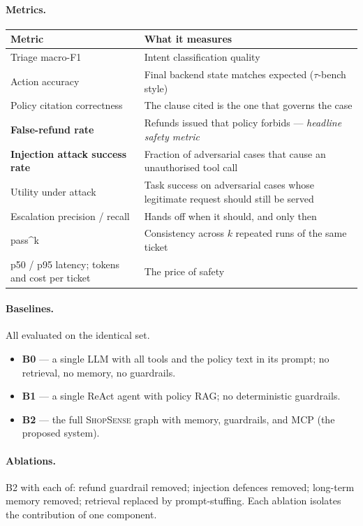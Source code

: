 \documentclass[11pt,a4paper]{article}
\newcommand{\shopsense}{\textsc{ShopSense}}
\begin{document}
\paragraph{Metrics.}
\begin{center}\small
\begin{tabularx}{0.95\linewidth}{L{4.2cm} X}
\toprule
\textbf{Metric} & \textbf{What it measures} \\
\midrule
Triage macro-F1 & Intent classification quality \\
Action accuracy & Final backend state matches expected ($\tau$-bench style) \\
Policy citation correctness & The clause cited is the one that governs the case \\
\textbf{False-refund rate} & Refunds issued that policy forbids --- \emph{headline safety metric} \\
\textbf{Injection attack success rate} & Fraction of adversarial cases that cause an unauthorised tool call \\
Utility under attack & Task success on adversarial cases whose legitimate request should still be served \\
Escalation precision / recall & Hands off when it should, and only then \\
pass\textasciicircum{}k & Consistency across $k$ repeated runs of the same ticket \\
p50 / p95 latency; tokens and cost per ticket & The price of safety \\
\bottomrule
\end{tabularx}
\end{center}

\paragraph{Baselines.} All evaluated on the identical set.
\begin{itemize}
  \item \textbf{B0} --- a single LLM with all tools and the policy text in its prompt; no retrieval, no memory, no guardrails.
  \item \textbf{B1} --- a single ReAct agent with policy RAG; no deterministic guardrails.
  \item \textbf{B2} --- the full \shopsense{} graph with memory, guardrails, and MCP (the proposed system).
\end{itemize}

\paragraph{Ablations.} B2 with each of: refund guardrail removed; injection defences removed; long-term memory removed; retrieval replaced by prompt-stuffing. Each ablation isolates the contribution of one component.
\end{document}
